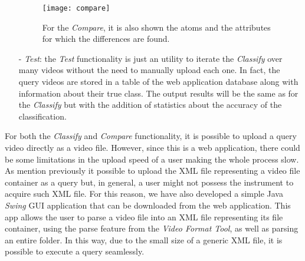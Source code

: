 \begin{itemize}
\begin{figure}
  \centering
  \texttt{[image: compare]}
  \caption{For the \emph{Compare}, it is also shown the atoms and the attributes for which the differences are found.}\label{fig:compare}
\end{figure}

\item[-] \emph{Test}: the \emph{Test} functionality is just an utility to iterate the \emph{Classify} over many videos without the need to manually upload each one. In fact, the query videos are stored in a table of the web application database along with information about their true class. The output results will be the same as for the \emph{Classify} but with the addition of statistics about the accuracy of the classification.

\end{itemize}

For both the \emph{Classify} and \emph{Compare} functionality, it is possible to upload a query video directly as a video file. However, since this is a web application, there could be some limitations in the upload speed of a user making the whole process slow. As mention previously it possible to upload the XML file representing a video file container as a query but, in general, a user might not possess the instrument to acquire such XML file. For this reason, we have also developed a simple Java \emph{Swing} GUI application that can be downloaded from the web application. This app allows the user to parse a video file into an XML file representing its file container, using the parse feature from the \emph{Video Format Tool}, as well as parsing an entire folder. In this way, due to the small size of a generic XML file, it is possible to execute a query seamlessly.